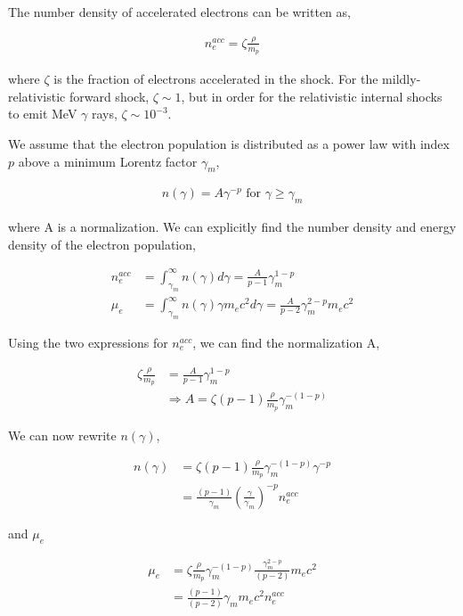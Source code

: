 \documentclass[linenumbers,twocolumn]{aastex631}
\begin{document}
\begin{appendix}
The number density of accelerated electrons can be written as,

\begin{align}
	n_e^{acc} = \zeta \frac{\rho}{m_p}
\end{align}

where $\zeta$ is the fraction of electrons accelerated in the shock. For the mildly-relativistic forward shock, $\zeta\sim1$, but in order for the relativistic internal shocks to emit MeV $\gamma$ rays, $\zeta\sim10^{-3}$. 

We assume that the electron population is distributed as a power law with index $p$ above a minimum Lorentz factor $\gamma_m$,

\begin{align}
	n(\gamma) = A\gamma^{-p} \text{ for } \gamma\geq\gamma_m
\end{align}

where A is a normalization. We can explicitly find the number density and energy density of the electron population, 

\begin{align}
	n_e^{acc} &= \int_{\gamma_m}^{\infty} n(\gamma)d\gamma = \frac{A}{p-1}\gamma_m^{1-p}\\
	\mu_e &= \int_{\gamma_m}^{\infty} n(\gamma) \gamma m_e c^2 d\gamma = \frac{A}{p-2}\gamma_m^{2-p} m_e c^2
\end{align}

Using the two expressions for $n_e^{acc}$, we can find the normalization A,

\begin{align}
	\zeta \frac{\rho}{m_p} &= \frac{A}{p-1}\gamma_m^{1-p} \\
	&\Rightarrow A = \zeta (p-1) \frac{\rho}{m_p}\gamma_m^{-(1-p)}
\end{align}

We can now rewrite $n(\gamma)$,

\begin{align}
	n(\gamma) &= \zeta (p-1) \frac{\rho}{m_p} \gamma_m^{-(1-p)} \gamma^{-p}\\
	&= \frac{(p-1)}{\gamma_m} \left(\frac{\gamma}{\gamma_m}\right)^{-p} n_e^{acc}
\end{align}

and $\mu_e$

\begin{align}
	\mu_e &= \zeta\frac{\rho}{m_p} \gamma_m^{-(1-p)}\frac{\gamma_m^{2-p}}{(p-2)} m_ec^2\\
	&= \frac{(p-1)}{(p-2)}\gamma_m m_e c^2 n_e^{acc}
\end{align}


\end{appendix}
\end{document}
